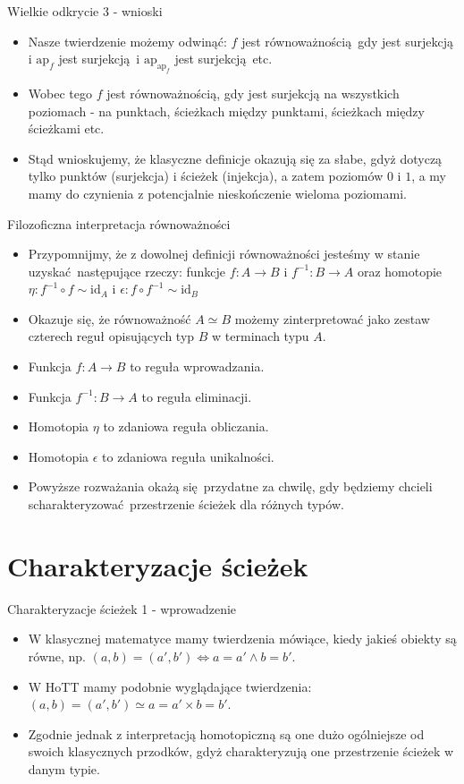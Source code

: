 \documentclass{beamer}
\newcommand{\id}{\text{id}}
\newcommand{\comp}{\circ}
\newcommand{\finv}[1]{#1^{-1}}
\newcommand{\inv}[1]{#1^{-1}}
\begin{document}
\begin{frame}{Wielkie odkrycie 3 - wnioski}
\begin{itemize}
	\item Nasze twierdzenie możemy odwinąć: $f$ jest równoważnością gdy jest surjekcją i $\text{ap}_f$ jest surjekcją i $\text{ap}_{\text{ap}_f}$ jest surjekcją etc.
	\item Wobec tego $f$ jest równoważnością, gdy jest surjekcją na wszystkich poziomach - na punktach, ścieżkach między punktami, ścieżkach między ścieżkami etc.
	\item Stąd wnioskujemy, że klasyczne definicje okazują się za słabe, gdyż dotyczą tylko punktów (surjekcja) i ścieżek (injekcja), a zatem poziomów $0$ i $1$, a my mamy do czynienia z potencjalnie nieskończenie wieloma poziomami.
\end{itemize}
\end{frame}

\begin{frame}{Filozoficzna interpretacja równoważności}
\begin{itemize}
	\item Przypomnijmy, że z dowolnej definicji równoważności jesteśmy w stanie uzyskać następujące rzeczy: funkcje $f : A \to B$ i $\inv{f} : B \to A$ oraz homotopie $\eta : \inv{f} \comp f \sim \id_A$ i $\epsilon : f \comp \inv{f} \sim \id_B$
	\item Okazuje się, że równoważność $A \simeq B$ możemy zinterpretować jako zestaw czterech reguł opisujących typ $B$ w terminach typu $A$.
	\item Funkcja $f : A \to B$ to reguła wprowadzania.
	\item Funkcja $\finv{f} : B \to A$ to reguła eliminacji.
	\item Homotopia $\eta$ to zdaniowa reguła obliczania.
	\item Homotopia $\epsilon$ to zdaniowa reguła unikalności.
	\item Powyższe rozważania okażą się przydatne za chwilę, gdy będziemy chcieli scharakteryzować przestrzenie ścieżek dla różnych typów.
\end{itemize}
\end{frame}

\section{Charakteryzacje ścieżek}

\begin{frame}{Charakteryzacje ścieżek 1 - wprowadzenie}
\begin{itemize}
	\item W klasycznej matematyce mamy twierdzenia mówiące, kiedy jakieś obiekty są równe, np. $(a, b) = (a', b') \iff a = a' \land b = b'$.
	\item W HoTT mamy podobnie wyglądające twierdzenia: $(a, b) = (a', b') \simeq a = a' \times b = b'$.
	\item Zgodnie jednak z interpretacją homotopiczną są one dużo ogólniejsze od swoich klasycznych przodków, gdyż charakteryzują one przestrzenie ścieżek w danym typie.
\end{itemize}
\end{frame}
\end{document}
